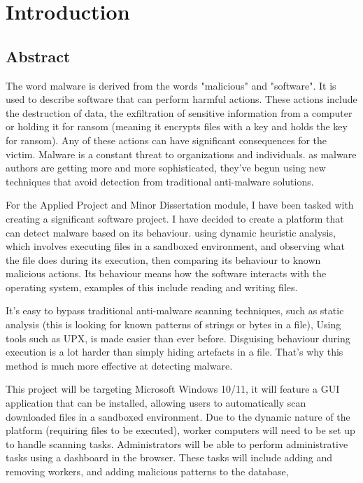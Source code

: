 \chapter{Introduction}

\section{Abstract}
The word malware is derived from the words "malicious" and "software".
It is used to describe software that can perform harmful actions.
These actions include the destruction of data,
the exfiltration of sensitive information from a computer or
holding it for ransom (meaning it encrypts files with a key and holds the key for ransom).
Any of these actions can have significant consequences for the victim.
Malware is a constant threat to organizations and individuals.
as malware authors are getting more and more sophisticated,
they've begun using new techniques that avoid detection from traditional anti-malware solutions.

For the Applied Project and Minor Dissertation module,
I have been tasked with creating a significant software project.
I have decided to create a platform that can detect malware based on its behaviour.
using dynamic heuristic analysis, which involves executing files in a sandboxed environment,
and observing what the file does during its execution,
then comparing its behaviour to known malicious actions.
Its behaviour means how the software interacts with the operating system,
examples of this include reading and writing files.

It's easy to bypass traditional anti-malware scanning techniques,
such as static analysis (this is looking for known patterns of strings or bytes in a file),
Using tools such as UPX, is made easier than ever before.
Disguising behaviour during execution is a lot harder than simply hiding artefacts in a file.
That's why this method is much more effective at detecting malware.

This project will be targeting Microsoft Windows 10/11,
it will feature a GUI application that can be installed,
allowing users to automatically scan downloaded files in a sandboxed environment.
Due to the dynamic nature of the platform (requiring files to be executed),
worker computers will need to be set up to handle scanning tasks.
Administrators will be able to perform administrative tasks using a dashboard in the browser.
These tasks will include adding and removing workers,
and adding malicious patterns to the database,

